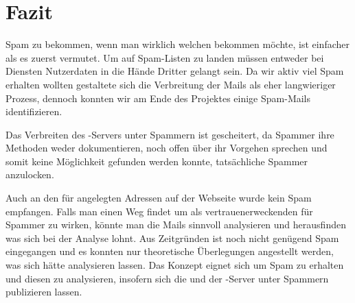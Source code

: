 \documentclass[a4paper,11pt,singlespacing]{article}
\begin{document}
\newpage


\section{Fazit}\label{sec:Fazit}
	Spam zu bekommen, wenn man wirklich welchen bekommen möchte, ist einfacher als es zuerst vermutet.
	Um auf Spam-Listen zu landen müssen entweder bei Diensten Nutzerdaten in die Hände Dritter gelangt sein.
	Da wir aktiv viel Spam erhalten wollten gestaltete sich die Verbreitung der Mails als eher langwieriger Prozess, dennoch konnten wir am Ende des Projektes einige Spam-Mails identifizieren.

	Das Verbreiten des -Servers unter Spammern ist gescheitert, da Spammer ihre Methoden weder dokumentieren, noch offen über ihr Vorgehen sprechen und somit keine Möglichkeit gefunden werden konnte, tatsächliche Spammer anzulocken.

	Auch an den für  angelegten Adressen auf der Webseite wurde kein Spam empfangen.
	Falls man einen Weg findet um als vertrauenerweckenden  für Spammer zu wirken, könnte man die Mails sinnvoll analysieren und herausfinden was sich bei der Analyse lohnt.
	Aus Zeitgründen ist noch nicht genügend Spam eingegangen und es konnten nur theoretische Überlegungen angestellt werden, was sich hätte analysieren lassen.
	Das Konzept eignet sich um Spam zu erhalten und diesen zu analysieren, insofern sich die  und der -Server unter Spammern publizieren lassen.

\newpage




\newpage


\listoffigures
{}
\newpage
\end{document}
